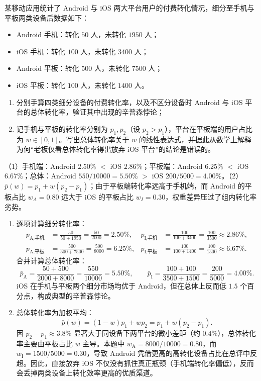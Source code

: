 \begin{exercise}[title={移动端 APP 转化率与辛普森悖论推导},level=standard,points=15,tags={辛普森悖论,加权平均,下钻分析}]
某移动应用统计了 Android 与 iOS 两大平台用户的付费转化情况，细分至手机与平板两类设备后数据如下：
\begin{itemize}
  \item Android 手机：转化 $50$ 人，未转化 $1950$ 人；
  \item iOS 手机：转化 $100$ 人，未转化 $3400$ 人；
  \item Android 平板：转化 $500$ 人，未转化 $7500$ 人；
  \item iOS 平板：转化 $100$ 人，未转化 $1400$ 人。
\end{itemize}
\begin{enumerate}
  \item 分别手算四类细分设备的付费转化率，以及不区分设备时 Android 与 iOS 平台的总体转化率，验证其中出现的辛普森悖论；
  \item 记手机与平板的转化率分别为 $p_1, p_2$（设 $p_2 > p_1$），平台在平板端的用户占比为 $w \in [0,1]$。写出总体转化率关于 $w$ 的线性表达式，并据此从数学上解释为何“老板仅看总体转化率得出放弃 iOS 平台”的结论是错误的。
\end{enumerate}
\begin{answer}
（1）手机端：Android $2.50\%$ $<$ iOS $2.86\%$；平板端：Android $6.25\%$ $<$ iOS $6.67\%$；总体：Android $550/10000 = 5.50\%$ $>$ iOS $200/5000 = 4.00\%$。（2）$\bar{p}(w) = p_1 + w(p_2 - p_1)$；由于平板端转化率远高于手机端，而 Android 的平板占比 $w_A = 0.80$ 远大于 iOS 的平板占比 $w_I = 0.30$，权重差异压过了组内转化率劣势。
\end{answer}
\begin{solution}
\begin{enumerate}
  \item 逐项计算细分转化率：
  \[\begin{aligned}
    p_{\text{A,手机}} &= \frac{50}{50+1950} = \frac{50}{2000} = 2.50\%, &
    p_{\text{I,手机}} &= \frac{100}{100+3400} = \frac{100}{3500} \approx 2.86\%, \\
    p_{\text{A,平板}} &= \frac{500}{500+7500} = \frac{500}{8000} = 6.25\%, &
    p_{\text{I,平板}} &= \frac{100}{100+1400} = \frac{100}{1500} \approx 6.67\%.
  \end{aligned}\]
  合并计算总体转化率：
  \[
    \bar{p}_{\text{A}} = \frac{50+500}{2000+8000} = \frac{550}{10000} = 5.50\%,\qquad
    \bar{p}_{\text{I}} = \frac{100+100}{3500+1500} = \frac{200}{5000} = 4.00\%.
  \]
  iOS 在手机与平板两个细分市场均优于 Android，但在总体上反而低 $1.5$ 个百分点，构成典型的辛普森悖论。
  \item 总体转化率为加权平均：
  \[
    \bar{p}(w) = (1-w)p_1 + w p_2 = p_1 + w(p_2 - p_1).
  \]
  因 $p_2 - p_1 \approx 3.8\%$ 显著大于同设备下两平台的微小差距（约 $0.4\%$），总体转化率主要由平板占比 $w$ 主导。本题中 $w_{\text{A}} = 8000/10000 = 0.80$，而 $w_{\text{I}} = 1500/5000 = 0.30$，导致 Android 凭借更高的高转化设备占比在总评中反超。因此，直接放弃 iOS 不仅没有抓住真正瓶颈（手机端转化率偏低），反而会丢掉两类设备上转化效率更高的优质渠道。
\end{enumerate}
\end{solution}
\end{exercise}

